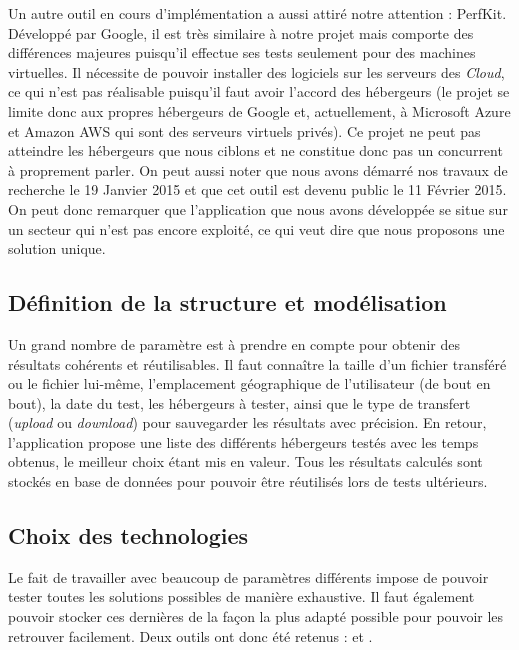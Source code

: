 \documentclass[10pt]{article}
\begin{document}
Un autre outil en cours d'implémentation a aussi attiré notre
attention : PerfKit. Développé par Google, il est très similaire à
notre projet mais comporte des différences majeures puisqu'il effectue
ses tests seulement pour des machines virtuelles. Il nécessite de
pouvoir installer des logiciels sur les serveurs des \textit{Cloud}, ce qui
n'est pas réalisable puisqu'il faut avoir l'accord des hébergeurs (le
projet se limite donc aux propres hébergeurs de Google et,
actuellement, à Microsoft Azure et Amazon AWS qui sont des serveurs
virtuels privés). Ce projet ne peut pas atteindre les hébergeurs que
nous ciblons et ne constitue donc pas un concurrent à proprement
parler. On peut aussi noter que nous avons démarré nos travaux de recherche le 19 Janvier 2015 et que cet outil est devenu public le 11 Février 2015. On peut donc remarquer que l’application que nous avons
développée se situe sur un secteur qui n’est pas encore exploité, ce
qui veut dire que nous proposons une solution unique.

\subsection{Définition de la structure et modélisation}

Un grand nombre de paramètre est à prendre en compte pour obtenir des
résultats cohérents et réutilisables. Il faut connaître la taille
d'un fichier transféré ou le fichier lui-même, l'emplacement géographique de l'utilisateur (de bout en bout), la date du test, les hébergeurs à tester, ainsi
que le type de transfert (\textit{upload} ou \textit{download}) pour sauvegarder les
résultats avec précision. En retour, l'application propose une liste
des différents hébergeurs testés avec les temps obtenus, le meilleur
choix étant mis en valeur. Tous les résultats calculés sont stockés en
base de données pour pouvoir être réutilisés lors de tests ultérieurs.

  
\subsection{Choix des technologies}

Le fait de travailler avec beaucoup de paramètres différents impose de
pouvoir tester toutes les solutions possibles de manière
exhaustive. Il faut également pouvoir stocker ces dernières de la
façon la plus adapté possible pour pouvoir les retrouver
facilement. Deux outils ont donc été retenus : \Execo \Engine et \MongoDB.
\end{document}
